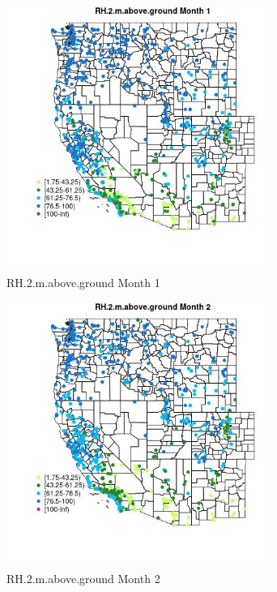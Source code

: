 \begin{figure} 
\centering  
\includegraphics[width=0.77\textwidth]{Code_Outputs/Report_ML_input_PM25_Step4_part_f_de_duplicated_aves_prioritize_24hr_obswNAs_MapObsMo1RH2maboveground.jpg} 
\caption{\label{fig:Report_ML_input_PM25_Step4_part_f_de_duplicated_aves_prioritize_24hr_obswNAsMapObsMo1RH2maboveground}RH.2.m.above.ground Month 1} 
\end{figure} 
 

\begin{figure} 
\centering  
\includegraphics[width=0.77\textwidth]{Code_Outputs/Report_ML_input_PM25_Step4_part_f_de_duplicated_aves_prioritize_24hr_obswNAs_MapObsMo2RH2maboveground.jpg} 
\caption{\label{fig:Report_ML_input_PM25_Step4_part_f_de_duplicated_aves_prioritize_24hr_obswNAsMapObsMo2RH2maboveground}RH.2.m.above.ground Month 2} 
\end{figure} 
 

